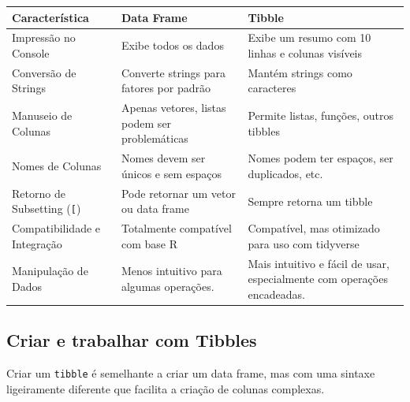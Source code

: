 \documentclass[
]{book}
\begin{document}
\begin{longtable}[]{@{}
  >{\raggedright\arraybackslash}p{}
  >{\raggedright\arraybackslash}p{}
  >{\raggedright\arraybackslash}p{}@{}}
\toprule\noalign{}
\begin{minipage}[b]{\linewidth}\raggedright
Característica
\end{minipage} & \begin{minipage}[b]{\linewidth}\raggedright
Data Frame
\end{minipage} & \begin{minipage}[b]{\linewidth}\raggedright
Tibble
\end{minipage} \\
\midrule\noalign{}
\endhead
\bottomrule\noalign{}
\endlastfoot
Impressão no Console & Exibe todos os dados & Exibe um resumo com 10 linhas e colunas visíveis \\
Conversão de Strings & Converte strings para fatores por padrão & Mantém strings como caracteres \\
Manuseio de Colunas & Apenas vetores, listas podem ser problemáticas & Permite listas, funções, outros tibbles \\
Nomes de Colunas & Nomes devem ser únicos e sem espaços & Nomes podem ter espaços, ser duplicados, etc. \\
Retorno de Subsetting (\texttt{{[}}) & Pode retornar um vetor ou data frame & Sempre retorna um tibble \\
Compatibilidade e Integração & Totalmente compatível com base R & Compatível, mas otimizado para uso com tidyverse \\
Manipulação de Dados & Menos intuitivo para algumas operações. & Mais intuitivo e fácil de usar, especialmente com operações encadeadas. \\
\end{longtable}

\subsection{Criar e trabalhar com Tibbles}\label{criar-e-trabalhar-com-tibbles}

Criar um \texttt{tibble} é semelhante a criar um data frame, mas com uma
sintaxe ligeiramente diferente que facilita a criação de colunas
complexas.
\end{document}
